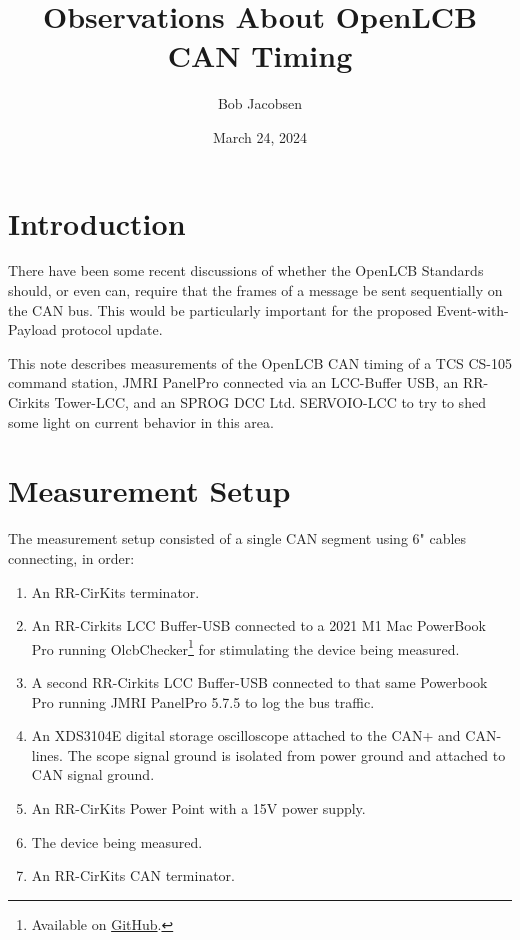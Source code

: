 \documentclass[11pt]{article}
\title{Observations About OpenLCB CAN Timing}
\author{Bob Jacobsen}
\date{March 24, 2024}                                         %
\begin{document}
\maketitle

\newcommand*{\xml}[1]{\texttt{<#1>}}

\newcommand{\ts}{\textsuperscript}

\newcommand{\us}{$\mu$s}

\section{Introduction}

There have been some recent discussions of whether the OpenLCB Standards
should, or even can, require that the frames of a message be sent 
sequentially on the CAN bus. This would be particularly important
for the proposed Event-with-Payload protocol update.

This note describes measurements of the OpenLCB CAN timing of 
a TCS CS-105 command station,
JMRI PanelPro connected via an LCC-Buffer USB, 
an RR-Cirkits Tower-LCC,
and an SPROG DCC Ltd. SERVOIO-LCC
to try to shed some light on 
current behavior in this area.

\section{Measurement Setup}

The measurement setup consisted of a single CAN segment using 6" cables connecting, 
in order:
\begin{enumerate}
\item An RR-CirKits terminator.
\item An RR-Cirkits LCC Buffer-USB connected to a 2021 M1 Mac PowerBook Pro running 
    OlcbChecker\footnote{Available on 
                \href{http://github.com/bobjacobsen/OlcbChecker}{GitHub}. }
    for stimulating the device being measured.
\item A second RR-Cirkits LCC Buffer-USB connected to that same Powerbook Pro running 
    JMRI PanelPro 5.7.5 to log the bus traffic.
\item An XDS3104E digital storage oscilloscope attached to the CAN+ and CAN- lines.
    The scope signal ground is isolated from power ground and attached to CAN signal ground.
\item An RR-CirKits Power Point with a 15V power supply.
\item The device being measured.
\item An RR-CirKits CAN terminator.
\end{enumerate}
\end{document}
